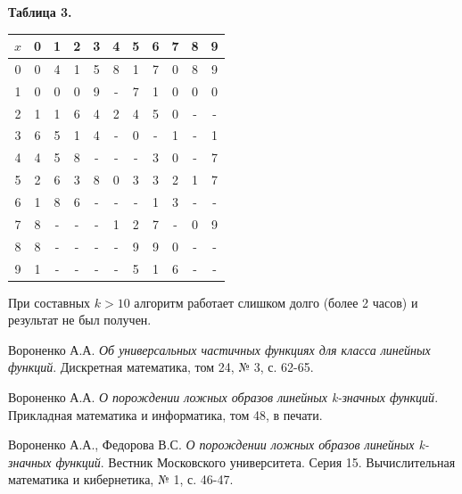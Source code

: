 \documentclass[oneside,final,14pt]{extreport}
\begin{document}
\centerline{\bf Таблица 3.}
\begin{center}
\begin{tabular}{|c|c|c|c|c|c|c|c|c|c|c|}
\hline \(x\) & 0 & 1 & 2 & 3 & 4 & 5 & 6 & 7 & 8 & 9 \\ \hline
0 & 0 & 4 & 1 & 5 & 8 & 1 & 7 & 0 & 8 & 9 \\ \hline 
1 & 0 & 0 & 0 & 9 & - & 7 & 1 & 0 & 0 & 0 \\ \hline 
2 & 1 & 1 & 6 & 4 & 2 & 4 & 5 & 0 & - & - \\ \hline 
3 & 6 & 5 & 1 & 4 & - & 0 & - & 1 & - & 1 \\ \hline 
4 & 4 & 5 & 8 & - & - & - & 3 & 0 & - & 7 \\ \hline 
5 & 2 & 6 & 3 & 8 & 0 & 3 & 3 & 2 & 1 & 7 \\ \hline 
6 & 1 & 8 & 6 & - & - & - & 1 & 3 & - & - \\ \hline 
7 & 8 & - & - & - & 1 & 2 & 7 & - & 0 & 9 \\ \hline 
8 & 8 & - & - & - & - & 9 & 9 & 0 & - & - \\ \hline 
9 & 1 & - & - & - & - & 5 & 1 & 6 & - & - \\ \hline 
\end{tabular}
\end{center}

При составных \(k > 10\) алгоритм работает слишком долго (более 2 часов) и результат не был получен.

\begin{thebibliography}{0}

 Вороненко А.А. \emph{Об универсальных частичных функциях для класса линейных функций}. 
Дискретная математика, том 24, № 3, с. 62-65.
 
 Вороненко А.А. \emph{О порождении ложных образов линейных k-значных функций}. 
Прикладная математика и информатика, том 48, в печати.

 Вороненко А.А., Федорова В.С. \emph{О порождении ложных образов линейных k-значных функций}.
Вестник Московского университета. Серия 15. Вычислительная математика и кибернетика, № 1, с. 46-47.

\end{thebibliography}
\end{document}
